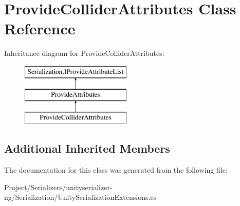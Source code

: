 \hypertarget{class_provide_collider_attributes}{}\section{Provide\+Collider\+Attributes Class Reference}
\label{class_provide_collider_attributes}
Inheritance diagram for Provide\+Collider\+Attributes\+:\begin{figure}[H]
\begin{center}
\leavevmode
\includegraphics[height=3.000000cm]{class_provide_collider_attributes}
\end{center}
\end{figure}
\subsection*{Additional Inherited Members}


The documentation for this class was generated from the following file\+:\begin{DoxyCompactItemize}
\item 
Project/\+Serializers/unityserializer-\/ng/\+Serialization/Unity\+Serialization\+Extensions.\+cs\end{DoxyCompactItemize}
